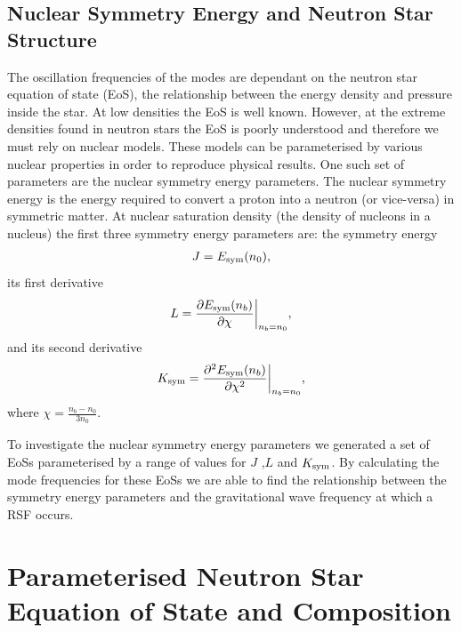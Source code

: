 \documentclass[fleqn,usenatbib]{mnras}
\begin{document}
\subsection{Nuclear Symmetry Energy and Neutron Star Structure}
\hspace{\parindent}The oscillation frequencies of the modes are dependant on the neutron star equation of state (EoS), the relationship between the energy density and pressure inside the star. At low densities the EoS is well known. %
However, at the extreme densities found in neutron stars the EoS is poorly understood and therefore we must rely on nuclear models. These models can be parameterised by various nuclear properties in order to reproduce physical results. One such set of parameters are the nuclear symmetry energy parameters. The nuclear symmetry energy is the energy required to convert a proton into a neutron (or vice-versa) in symmetric matter. At nuclear saturation density (the density of nucleons in a nucleus) the first three symmetry energy parameters are: the symmetry energy
\begin{align}
J=E_{\rm sym}(n_0),    
\label{eq:sym_J}
\end{align}
\noindent its first derivative 
\begin{align}
L=\frac{\partial E_{\rm sym}(n_b)}{\partial \chi}\biggr\rvert_{n_b=n_0},  
\label{eq:sym_L}
\end{align}
\noindent and its second derivative
\begin{align}
K_{\rm sym}=\frac{\partial^2 E_{\rm sym}(n_b)}{\partial \chi^2}\biggr\rvert_{n_b=n_0},
\label{eq:sym_K}
\end{align}
\noindent where $\chi=\frac{n_b-n_0}{3n_0}$.

\hspace{\parindent}To investigate the nuclear symmetry energy parameters we generated a set of EoSs parameterised by a range of values for $J$ ,$L$ and $K_{\rm sym}$. By calculating the mode frequencies for these EoSs we are able to find the relationship between the symmetry energy parameters and the gravitational wave frequency at which a RSF occurs.

\section{Parameterised Neutron Star Equation of State and Composition}
\end{document}

